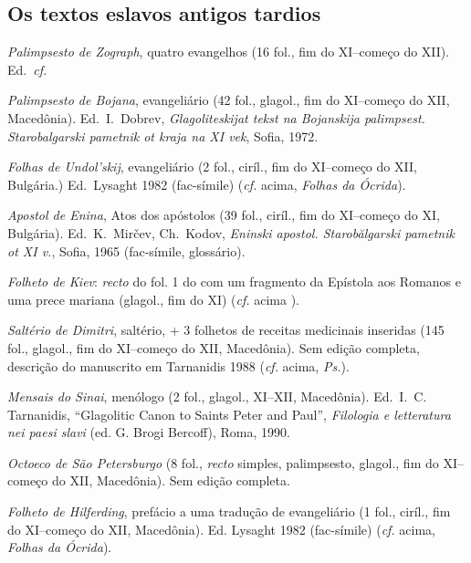 \subsection{Os textos eslavos antigos tardios}
\begin{compactitem}[--]
	\item \emph{Palimpsesto de Zograph}, quatro evangelhos (16 fol., fim do
	XI--começo do XII). Ed.\ \emph{cf.} 
	\item \emph{Palimpsesto de Bojana}, evangeliário (42 fol., glagol., fim do
	XI--começo do XII, Macedônia). Ed.\ I.\ Dobrev, \emph{Glagoliteskijat tekst
		na Bojanskija palimpsest. Starobalgarski pametnik ot kraja na XI vek},
	Sofia, 1972.
	\item \emph{Folhas de Undol'skij}, evangeliário (2 fol., ciríl., fim do
	XI--começo do XII, Bulgária.) Ed.\ Lysaght 1982 (fac-símile) (\emph{cf.}
	acima, \emph{Folhas da Ócrida}).
	\item \emph{Apostol de Enina}, Atos dos apóstolos (39 fol., ciríl., fim do
	XI--começo do XI, Bulgária). Ed.\ K.\ Mirčev, Ch.\ Kodov, \emph{Eninski
		apostol. Starobălgarski pametnik ot XI v.}, Sofia, 1965 (fac-símile,
	glossário).
	\item \emph{Folheto de Kiev}: \emph{recto} do fol. 1 do 
	com um fragmento da Epístola aos Romanos e uma prece mariana (glagol., fim
	do XI) (\emph{cf.} acima ).
	\item \emph{Saltério de Dimitri}, saltério, + 3 folhetos de receitas
	medicinais inseridas (145 fol., glagol., fim do XI--começo do XII, Macedônia).
	Sem edição completa, descrição do manuscrito em Tarnanidis 1988 (\emph{cf.}
	acima, \emph{Ps.}).
	\item \emph{Mensais do Sinai}, menólogo (2 fol., glagol., XI--XII, Macedônia).
	Ed.\ I.\ C. Tarnanidis, ``Glagolitic Canon to Saints Peter and Paul'',
	\emph{Filologia e letteratura nei paesi slavi} (ed. G. Brogi Bercoff), Roma, 1990.
	\item \emph{Octoeco de São Petersburgo} (8 fol., \emph{recto} simples,
	palimpsesto, glagol., fim do XI--começo do XII, Macedônia).
	Sem edição completa.
	\item \emph{Folheto de Hilferding}, prefácio a uma tradução de evangeliário (1 fol.,
	ciríl., fim do XI--começo do XII, Macedônia). Ed. Lysaght 1982 (fac-símile)
	(\emph{cf.} acima, \emph{Folhas da Ócrida}).

\end{compactitem}

